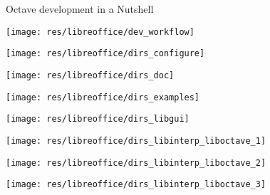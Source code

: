 \begin{frame}{Octave development in a Nutshell}
\begin{center}
\texttt{[image: res/libreoffice/dev\_workflow]}
\end{center}
\end{frame}


\begin{frame}
\begin{center}
\texttt{[image: res/libreoffice/dirs\_configure]}
\end{center}
\end{frame}


\begin{frame}
\begin{center}
\texttt{[image: res/libreoffice/dirs\_doc]}
\end{center}
\end{frame}


\begin{frame}
\begin{center}
\texttt{[image: res/libreoffice/dirs\_examples]}
\end{center}
\end{frame}


\begin{frame}
\begin{center}
\texttt{[image: res/libreoffice/dirs\_libgui]}
\end{center}
\end{frame}


\begin{frame}
\begin{center}
\texttt{[image: res/libreoffice/dirs\_libinterp\_liboctave\_1]}
\end{center}
\end{frame}


\begin{frame}
\begin{center}
\texttt{[image: res/libreoffice/dirs\_libinterp\_liboctave\_2]}
\end{center}
\end{frame}


\begin{frame}
\begin{center}
\texttt{[image: res/libreoffice/dirs\_libinterp\_liboctave\_3]}
\end{center}
\end{frame}


